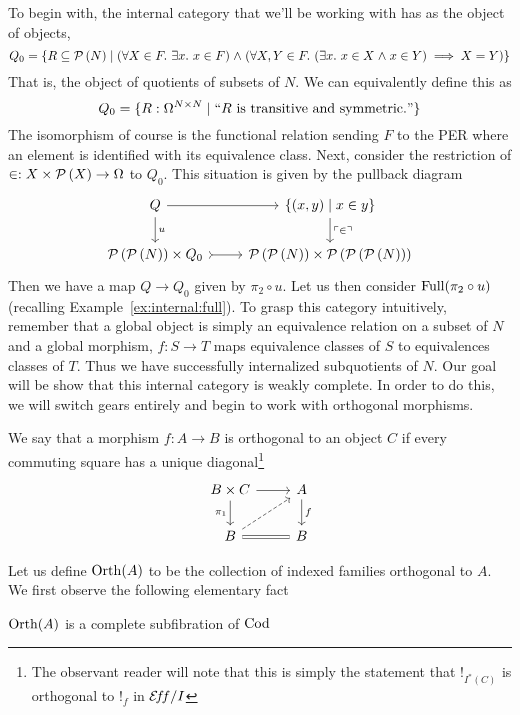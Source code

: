 To begin with, the internal category that we'll be working with has as
the object of objects,
\[
  Q_0 = \{R \subseteq \mathcal{P}\left(N\right) \mid (\forall X \in F.\ \exists x.\ x \in F)
  \mathrel{\wedge}
  (\forall X, Y \in F.\ (\exists x.\ x \in X \mathrel{\wedge} x \in Y) \implies X = Y)\}
\]
That is, the object of quotients of subsets of $N$. We can
equivalently define this as
\[
  Q_0 = \{R : \Omega^{N \times N} \mid ``R \text{ is transitive and symmetric.}"\}
\]
The isomorphism of course is the functional relation sending $F$ to
the PER where an element is identified with its equivalence
class. Next, consider the restriction of
$\in : X \times \mathcal{P}\left(X\right) \to \Omega$ to $Q_0$. This situation is given
by the pullback diagram
\[
  \begin{tikzcd}
    Q \ar[d, "u"] \ar[r] & {\{(x, y) \mid x \in y\}} \ar[d, "\unchar{\in}"]\\
     \pow{\pow{N}} \times Q_0 \ar[r, rightarrowtail] & \pow{\pow{N}} \times \pow{\pow{\pow{N}}}
  \end{tikzcd}
\]
Then we have a map $Q \to Q_0$ given by $\pi_2 \circ u$. Let us then
consider $\operatorname{Full}(\pi_2 \circ u)$ (recalling
Example~\ref{ex:internal:full}). To grasp this category intuitively,
remember that a global object is simply an equivalence relation on a
subset of $N$ and a global morphism, $f : S \to T$ maps equivalence
classes of $S$ to equivalences classes of $T$. Thus we have
successfully internalized subquotients of $N$. Our goal will be show
that this internal category is weakly complete. In order to do this,
we will switch gears entirely and begin to work with orthogonal
morphisms.
\begin{defn}\label{defn:orth:orth}
  We say that a morphism $f : A \to B$ is orthogonal to an object $C$
  if every commuting square has a unique diagonal\footnote{The
    observant reader will note that this is simply the statement that
    $!_{I^*(C)}$ is orthogonal to $!_{f}$ in $\mathcal{E}\!f\!f/I$}
  \[
    \begin{tikzcd}
      B \times C \ar[d, swap, "\pi_1"] \ar[r] & A \ar[d, "f"]\\
      B \ar[r, equals] \ar[ur, dashed] & B
    \end{tikzcd}
  \]
\end{defn}
Let us define $\operatorname{Orth}(A)$ to be the collection of indexed families
orthogonal to $A$. We first observe the following elementary fact
\begin{thm}\label{thm:orth:orthfibration}
  $\operatorname{Orth}(A)$ is a complete subfibration of $\operatorname{Cod}$
\end{thm}
